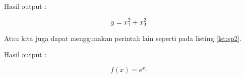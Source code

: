 Hasil output :

\begin{displaymath}
y = x\sb{1}\sp{2} + x\sb{2}\sp{2}
\end{displaymath}

Atau kita juga dapat menggunakan perintah lain seperti pada listing \ref{lst:sp2}.



Hasil output :

\begin{displaymath}
f(x) = e^{x_1}
\end{displaymath}